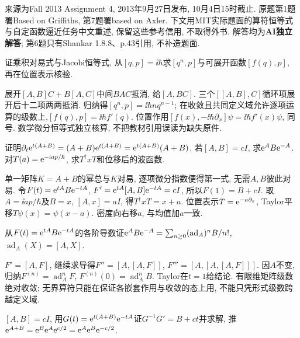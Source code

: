 来源为Fall 2013 Assignment 4, 2013年9月27日发布, 10月4日15时截止. 原题第1题署Based on Griffiths, 第7题署based on Axler. 下文用MIT实际题面的算符恒等式与自定函数逼近任务中文重述, 保留这些参考信用, 不取得外书. 解答均为\textbf{AI独立解答}; 第6题只有Shankar 1.8.8、p.43引用, 不补造题面.
\begin{exercise}
证乘积对易式与Jacobi恒等式, 从$[q,p]=\ii\hbar$求$[q^n,p]$与可展开函数$[f(q),p]$, 再在位置表示核验.
\end{exercise}
\begin{solution}
展开$[A,B]C+B[A,C]$中间$BAC$抵消, 给$[A,BC]$. 三个$[[A,B],C]$循环项展开后十二项两两抵消. 归纳得$[q^n,p]=\ii\hbar nq^{n-1}$; 在收敛且共同定义域允许逐项运算的级数上,$[f(q),p]=\ii\hbar f'(q)$. 位置作用$[f(x),-\ii\hbar\partial_x]\psi=\ii\hbar f'(x)\psi$, 同号. 数学微分恒等式独立核算, 不把教材引用误读为缺失原件.
\end{solution}
\begin{exercise}
证明$\partial_t\mathrm e^{t(A+B)}=(A+B)\mathrm e^{t(A+B)}=\mathrm e^{t(A+B)}(A+B)$. 若$[A,B]=cI$, 求$\mathrm e^AB\mathrm e^{-A}$. 对$T(a)=\mathrm e^{-\mathrm i ap/\hbar}$, 求$T^\dagger xT$和位移后的波函数.
\end{exercise}
\begin{solution}
单一矩阵$K=A+B$的幂总与$K$对易, 逐项微分指数便得第一式, 无需$A,B$彼此对易. 令$F(t)=\mathrm e^{tA}B\mathrm e^{-tA}$, $F'=\mathrm e^{tA}[A,B]\mathrm e^{-tA}=cI$, 所以$F(1)=B+cI$. 取$A=\ii ap/\hbar$及$B=x$, $[A,x]=aI$, 得$T^\dagger xT=x+a$. 位置表示$T=\mathrm e^{-a\partial_x}$, Taylor平移$T\psi(x)=\psi(x-a)$. 密度向右移$a$, 与均值加$a$一致.
\end{solution}
\begin{exercise}
从$F(t)=\mathrm e^{tA}B\mathrm e^{-tA}$的各阶导数证$\mathrm e^AB\mathrm e^{-A}=\sum_{n\ge0}(\operatorname{ad}_A)^nB/n!$, $\operatorname{ad}_A(X)=[A,X]$.
\end{exercise}
\begin{solution}
$F'=[A,F]$, 继续求导得$F''=[A,[A,F]]$, $F'''=[A,[A,[A,F]]]$. 因$A$不变, 归纳$F^{(n)}=\operatorname{ad}_A^nF$, $F^{(n)}(0)=\operatorname{ad}_A^nB$. Taylor在$t=1$给结论. 有限维矩阵级数绝对收敛; 无界算符只能在保证各嵌套作用与收敛的态上用, 不能只凭形式级数跨越定义域.
\end{solution}
\begin{exercise}
$[A,B]=cI$, 用$G(t)=\mathrm e^{t(A+B)}\mathrm e^{-tA}$证$G^{-1}G'=B+ct$并求解, 推$\mathrm e^{A+B}=\mathrm e^B\mathrm e^A\mathrm e^{c/2}=\mathrm e^A\mathrm e^B\mathrm e^{-c/2}$.
\end{exercise}
